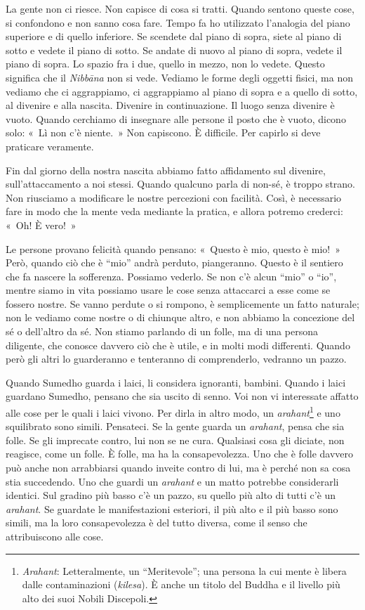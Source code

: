 La gente non ci riesce. Non capisce di cosa si tratti. Quando sentono
queste cose, si confondono e non sanno cosa fare. Tempo fa ho utilizzato
l'analogia del piano superiore e di quello inferiore. Se scendete dal
piano di sopra, siete al piano di sotto e vedete il piano di sotto. Se
andate di nuovo al piano di sopra, vedete il piano di sopra. Lo spazio
fra i due, quello in mezzo, non lo vedete. Questo significa che il
\emph{Nibbāna} non si vede. Vediamo le forme degli oggetti fisici, ma
non vediamo che ci aggrappiamo, ci aggrappiamo al piano di sopra e a
quello di sotto, al divenire e alla nascita. Divenire in continuazione.
Il luogo senza divenire è vuoto. Quando cerchiamo di insegnare alle
persone il posto che è vuoto, dicono solo: «~Lì non c'è niente.~» Non
capiscono. È difficile. Per capirlo si deve praticare veramente.

Fin dal giorno della nostra nascita abbiamo fatto affidamento sul
divenire, sull'attaccamento a noi stessi. Quando qualcuno parla di
non-sé, è troppo strano. Non riusciamo a modificare le nostre percezioni
con facilità. Così, è necessario fare in modo che la mente veda mediante
la pratica, e allora potremo crederci: «~Oh! È vero!~»

Le persone provano felicità quando pensano: «~Questo è mio, questo è
mio!~» Però, quando ciò che è ``mio'' andrà perduto, piangeranno. Questo
è il sentiero che fa nascere la sofferenza. Possiamo vederlo. Se non c'è
alcun ``mio'' o ``io'', mentre siamo in vita possiamo usare le cose
senza attaccarci a esse come se fossero nostre. Se vanno perdute o si
rompono, è semplicemente un fatto naturale; non le vediamo come nostre o
di chiunque altro, e non abbiamo la concezione del sé o dell'altro da
sé. Non stiamo parlando di un folle, ma di una persona diligente, che
conosce davvero ciò che è utile, e in molti modi differenti. Quando però
gli altri lo guarderanno e tenteranno di comprenderlo, vedranno un
pazzo.

Quando Sumedho guarda i laici, li considera ignoranti, bambini. Quando i
laici guardano Sumedho, pensano che sia uscito di senno. Voi non vi
interessate affatto alle cose per le quali i laici vivono. Per dirla in
altro modo, un \emph{arahant}\footnote{\emph{Arahant}: Letteralmente, un
  ``Meritevole''; una persona la cui mente è libera dalle contaminazioni
  (\emph{kilesa}). È anche un titolo del Buddha e il livello più alto
  dei suoi Nobili Discepoli.} e uno squilibrato sono simili. Pensateci.
Se la gente guarda un \emph{arahant}, pensa che sia folle. Se gli
imprecate contro, lui non se ne cura. Qualsiasi cosa gli diciate, non
reagisce, come un folle. È folle, ma ha la consapevolezza. Uno che è
folle davvero può anche non arrabbiarsi quando inveite contro di lui, ma
è perché non sa cosa stia succedendo. Uno che guardi un \emph{arahant} e
un matto potrebbe considerarli identici. Sul gradino più basso c'è un
pazzo, su quello più alto di tutti c'è un \emph{arahant}. Se guardate le
manifestazioni esteriori, il più alto e il più basso sono simili, ma la
loro consapevolezza è del tutto diversa, come il senso che attribuiscono
alle cose.

